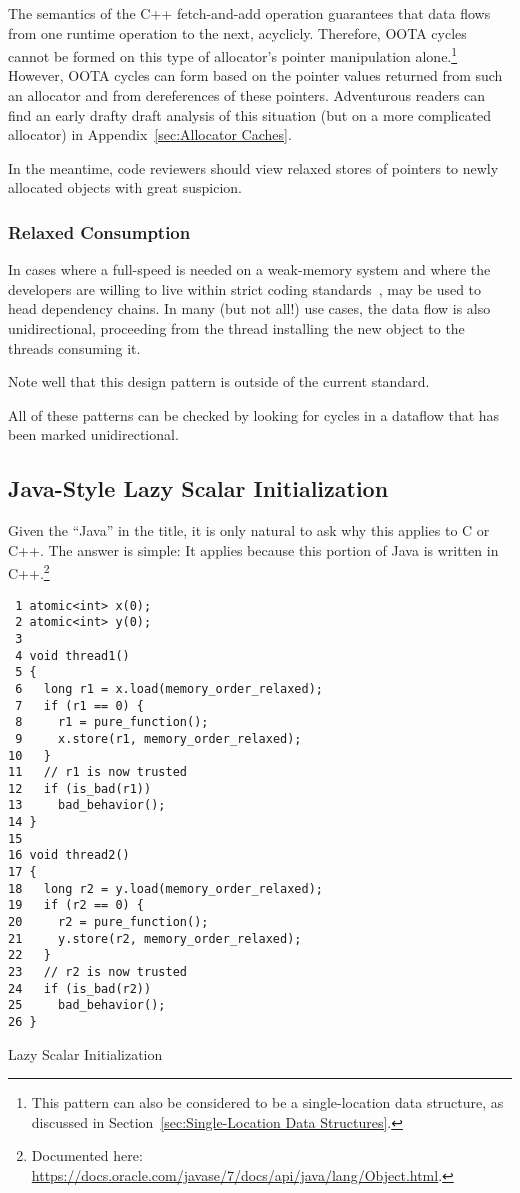 \documentclass[10]{article}
\begin{document}
The semantics of the C++ fetch-and-add operation guarantees that
data flows from one runtime operation to the next, acyclicly.
Therefore, OOTA cycles cannot be formed on this type of allocator's
pointer manipulation alone.\footnote{
	This pattern can also be considered to be a
	single-location data structure, as discussed in
	Section~\ref{sec:Single-Location Data Structures}.}
However, OOTA cycles can form based on the pointer values returned from
such an allocator and from dereferences of these pointers.
Adventurous readers can find an early drafty draft analysis of this
situation (but on a more complicated allocator) in
Appendix~\ref{sec:Allocator Caches}.

In the meantime, code reviewers should view relaxed stores of pointers to
newly allocated objects with great suspicion.

\subsubsection{Relaxed Consumption}
\label{sec:Relaxed Consumption}

In cases where a full-speed  is needed on a
weak-memory system and where the developers are willing to live within
strict coding standards~\cite{PaulEMcKenney2014rcu-dereference},
 may be used to head dependency chains.
In many (but not all!) use cases, the data flow is also unidirectional,
proceeding from the thread installing the new object to the threads
consuming it.

Note well that this design pattern is outside of the current standard.

All of these patterns can be checked by looking for cycles in a dataflow
that has been marked unidirectional.

\subsection{Java-Style Lazy Scalar Initialization}
\label{sec:Java-Style Lazy Scalar Initialization}

Given the ``Java'' in the title, it is only natural to ask why this
applies to C or C++.
The answer is simple:
It applies because this portion of Java is written in C++.\footnote{
	Documented here:
	\url{https://docs.oracle.com/javase/7/docs/api/java/lang/Object.html}.}

\begin{listing}[tbp]
\begin{verbatim}
 1 atomic<int> x(0);
 2 atomic<int> y(0);
 3
 4 void thread1()
 5 {
 6   long r1 = x.load(memory_order_relaxed);
 7   if (r1 == 0) {
 8     r1 = pure_function();
 9     x.store(r1, memory_order_relaxed);
10   }
11   // r1 is now trusted
12   if (is_bad(r1))
13     bad_behavior();
14 }
15
16 void thread2()
17 {
18   long r2 = y.load(memory_order_relaxed);
19   if (r2 == 0) {
20     r2 = pure_function();
21     y.store(r2, memory_order_relaxed);
22   }
23   // r2 is now trusted
24   if (is_bad(r2))
25     bad_behavior();
26 }
\end{verbatim}
\caption{Lazy Scalar Initialization}
\label{lst:Lazy Scalar Initialization}
\end{listing}
\end{document}
